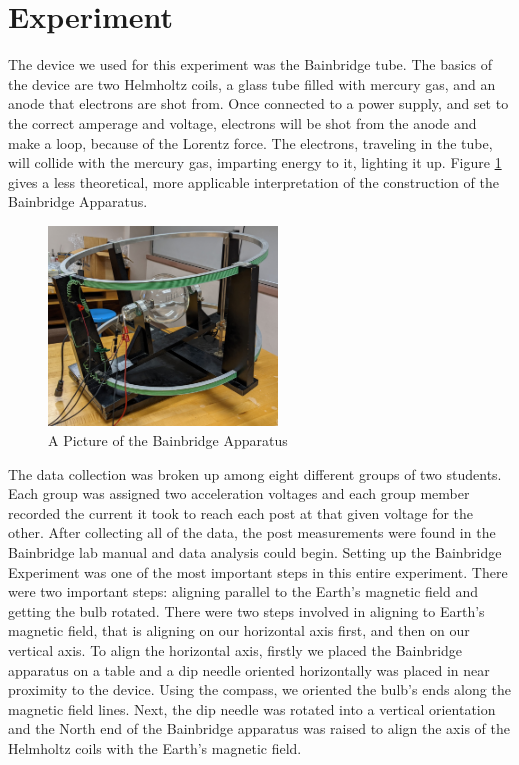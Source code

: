\documentclass[aps,prl,10pt,twocolumn,floatfix]{revtex4-2}
\begin{document}
\section{Experiment}
The device we used for this experiment was the Bainbridge tube.
The basics of the device are two Helmholtz coils, a glass tube filled with mercury gas, and an anode that electrons are shot from.
Once connected to a power supply, and set to the correct amperage and voltage, electrons will be shot from the anode and make a loop, because of the Lorentz force.
The electrons, traveling in the tube, will collide with the mercury gas, imparting energy to it, lighting it up.
Figure \ref{bain} gives a less theoretical, more applicable interpretation of the construction of the Bainbridge Apparatus.
\begin{figure}\label{bain}
    \includegraphics[width=230px]{bain.jpeg}
    \caption{A Picture of the Bainbridge Apparatus}
\end{figure}
The data collection was broken up among eight different groups of two students.
Each group was assigned two acceleration voltages and each group member recorded the current it took to reach each post at that given voltage for the other.
After collecting all of the data, the post measurements were found in the Bainbridge lab manual and data analysis could begin.
Setting up the Bainbridge Experiment was one of the most important steps in this entire experiment.
There were two important steps: aligning parallel to the Earth's magnetic field and getting the bulb rotated.
There were two steps involved in aligning to Earth's magnetic field, that is aligning on our horizontal axis first, and then on our vertical axis.
To align the horizontal axis, firstly we placed the Bainbridge apparatus on a table and a dip needle oriented horizontally was placed in near proximity to the device.
Using the compass, we oriented the bulb's ends along the magnetic field lines.
Next, the dip needle was rotated into a vertical orientation and the North end of the Bainbridge apparatus was raised to align the axis of the Helmholtz coils with the Earth's magnetic field.
\end{document}
